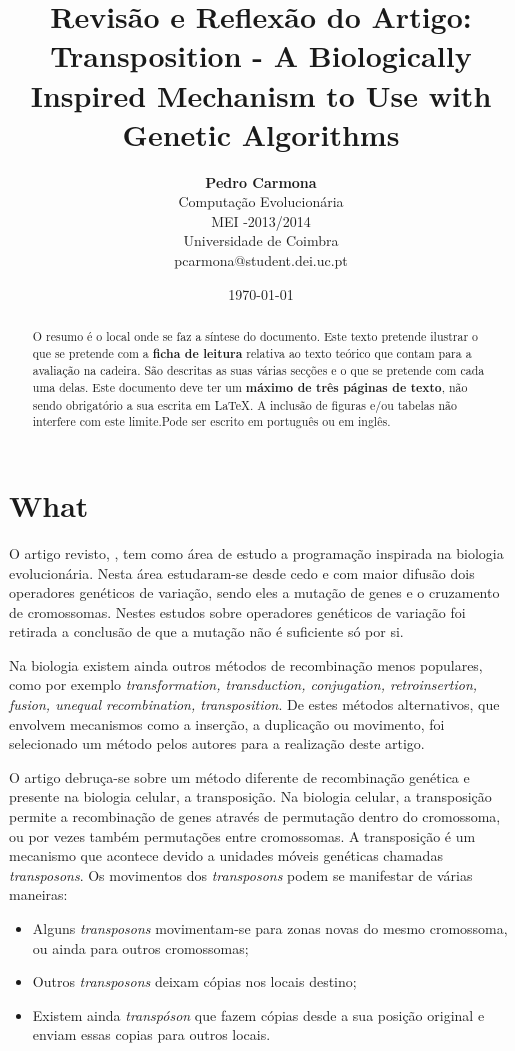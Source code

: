 \documentclass[12pt,portuguese,a4paper]{article}
\title{\LARGE{\textbf{Revisão e Reflexão do Artigo:}}\\ Transposition - A Biologically Inspired Mechanism to Use with Genetic Algorithms \cite{Simoes99transposition:a}}
\author{ \textbf{Pedro Carmona} \\ Computação Evolucionária\\ MEI -2013/2014 \\ Universidade de Coimbra \\ pcarmona@student.dei.uc.pt}
\date{\today}
\begin{document}
\maketitle

\begin{abstract}

O resumo é o local onde se faz a síntese do documento.
Este texto pretende ilustrar o que se pretende com a \textbf{ficha de leitura} relativa ao texto teórico que contam para a avaliação na cadeira. São descritas as suas várias secções e o que se pretende com cada uma delas.  Este documento deve ter um \textbf{máximo de três páginas de texto}, não sendo obrigatório a sua escrita em \LaTeX{}. A inclusão de figuras e/ou tabelas não  interfere com este limite.Pode ser escrito em português ou em inglês.
\end{abstract}

\section{What}


O artigo revisto, \cite{Simoes99transposition:a}, tem como área de estudo a programação inspirada na biologia evolucionária.
Nesta área estudaram-se desde cedo e com maior difusão dois operadores genéticos de variação, sendo eles a mutação de genes e o cruzamento de cromossomas. Nestes estudos sobre operadores genéticos de variação foi retirada a conclusão de que a mutação não é suficiente só por si.

Na biologia existem ainda outros métodos de recombinação menos populares, como por exemplo \textit{transformation, transduction, conjugation, retroinsertion, fusion, unequal recombination, transposition}\cite{Simoes99transposition:a}. De estes métodos alternativos, que envolvem mecanismos como a inserção, a duplicação ou movimento, foi selecionado um método pelos autores para a realização deste artigo.

O artigo debruça-se sobre um método diferente de recombinação genética e presente na biologia celular, a transposição.
Na biologia celular, a transposição permite a recombinação de genes através de permutação dentro do cromossoma, ou por vezes também permutações entre cromossomas.
A transposição é um mecanismo que acontece devido a unidades móveis genéticas chamadas \textit{transposons}.
Os movimentos dos \textit{transposons} podem se manifestar de várias maneiras:
\begin{itemize}
    \item Alguns \textit{transposons} movimentam-se para zonas novas do mesmo cromossoma, ou ainda para outros cromossomas;
    \item Outros \textit{transposons} deixam cópias nos locais destino;
    \item Existem ainda \textit{transpóson} que fazem cópias desde a sua posição original e enviam essas copias para outros locais.
\end{itemize}
\end{document}
